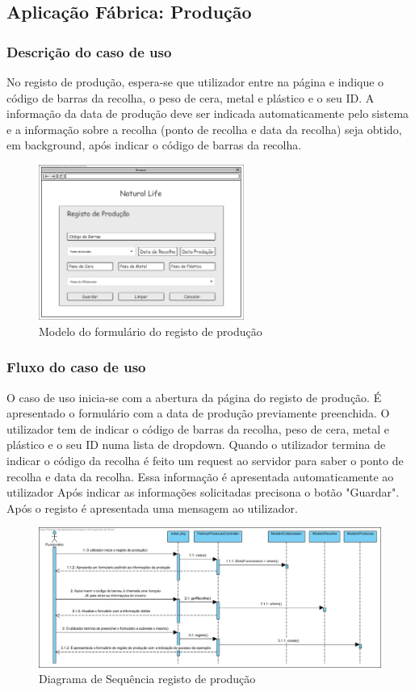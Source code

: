 \subsection{Aplicação Fábrica: Produção}
\subsubsection*{Descrição do caso de uso}
No registo de produção, espera-se que utilizador entre na página e indique o código de barras da recolha, o peso de cera, metal e plástico e o seu ID. A informação da data de produção deve ser indicada automaticamente pelo sistema e a informação sobre a recolha (ponto de recolha e data da recolha) seja obtido, em background, após indicar o código de barras da recolha.

\begin{figure}[H] 
	\begin{center}
		\includegraphics[width=0.60\textwidth,keepaspectratio]{figuras/Diagramas_vp/DI_Fabrica_3_Registo_de_Produção.jpg}
		\caption{Modelo do formulário do registo de produção}
		\label{fig:di_producao} 
	\end{center}
\end{figure}

\subsubsection*{Fluxo do caso de uso}
O caso de uso inicia-se com a abertura da página do registo de produção. É apresentado o formulário com a data de produção previamente preenchida. O utilizador tem de indicar o código de barras da recolha, peso de cera, metal e plástico e o seu ID numa lista de dropdown. Quando o utilizador termina de indicar o código da recolha é feito um request ao servidor para saber o ponto de recolha e data da recolha. Essa informação é apresentada automaticamente ao utilizador Após indicar as informações solicitadas precisona o botão "Guardar". Após o registo é apresentada uma mensagem ao utilizador.

\begin{figure}[H] 
	\begin{center}
		\includegraphics[width=\textwidth,keepaspectratio]{figuras/Diagramas_vp/SD_Fabrica_3_Registo_de_Produção.jpg}
		\caption{Diagrama de Sequência registo de produção}
		\label{fig:sd_producao} 
	\end{center}
\end{figure}